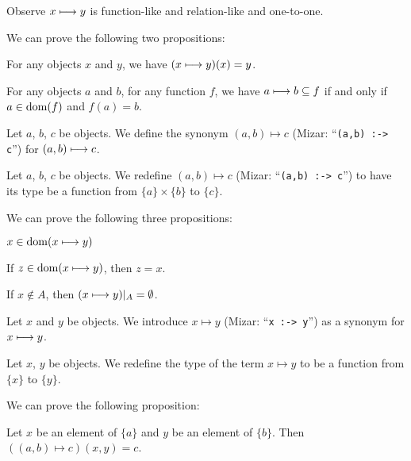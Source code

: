 \documentclass{article}
\begin{document}
Observe $x\longmapsto  y$ is function-like and relation-like and one-to-one.

We can prove the following two propositions:
\begin{thm}
\item\label{funcop1:72} For any objects $x$ and $y$, we have
  $(x\longmapsto y)(x)=y$.
\item\label{funcop1:73} For any objects $a$ and $b$, for any function
  $f$, we have $a\longmapsto b\subseteq f$ if and only if $a\in\operatorname{dom}(f)$
  and $f(a)=b$.
\end{thm}

\begin{notation}
Let $a$, $b$, $c$ be objects.
We define the synonym $(a,b)\mapsto c$ (Mizar: ``\verb#(a,b) :-> c#'')
for $(a,b)\longmapsto c$.
\end{notation}

\begin{definition}
Let $a$, $b$, $c$ be objects.
We redefine $(a,b)\mapsto c$ (Mizar: ``\verb#(a,b) :-> c#'')
to have its type be a function from $\{a\}\times\{b\}$ to $\{c\}$.
\end{definition}

We can prove the following three propositions:
\begin{thm}
\item\label{funcop1:74} $x\in\operatorname{dom}(x\longmapsto y)$
\item\label{funcop1:75} If $z\in\operatorname{dom}(x\longmapsto y)$, then $z=x$.
\item\label{funcop1:76} If $x\notin A$, then $(x\longmapsto y)|_{A}=\emptyset$.
\end{thm}

\begin{notation}
Let $x$ and $y$ be objects. We introduce $x\mapsto y$ (Mizar:
``\verb#x :-> y#'') as a synonym for $x\longmapsto y$.
\end{notation}

\begin{definition}
Let $x$, $y$ be objects.
We redefine the type of the term $x\mapsto y$ to be a function from
$\{x\}$ to $\{y\}$.
\end{definition}

We can prove the following proposition:
\begin{thm}
\item\label{funcop1:77} Let $x$ be an element of $\{a\}$ and $y$ be an
  element of $\{b\}$. Then $((a,b)\mapsto c)(x,y)=c$.
\end{thm}
\end{document}
